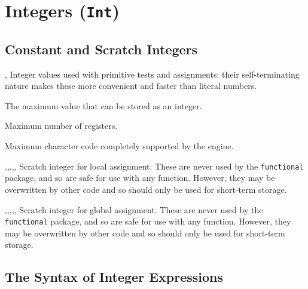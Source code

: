 \documentclass[oneside]{book}
\begin{document}
\chapter{Integers (\texttt{Int})}

\section{Constant and Scratch Integers}

\begin{variable}{\cZeroInt,\cOneInt}
Integer values used with primitive tests and assignments: their
self-terminating nature makes these more convenient and faster than
literal numbers.
\end{variable}

\begin{variable}{\cMaxInt}
The maximum value that can be stored as an integer.
\end{variable}

\begin{variable}{\cMaxRegisterInt}
Maximum number of registers.
\end{variable}

\begin{variable}{\cMaxCharInt}
Maximum character code completely supported by the engine.
\end{variable}

\begin{variable}{\lTmpaInt,\lTmpbInt,\lTmpcInt,\lTmpiInt,\lTmpjInt,\lTmpkInt}
Scratch integer for local assignment. These are never used by
the \verb!functional! package, and so are safe for use with any
function. However, they may be overwritten by other
code and so should only be used for short-term storage.
\end{variable}

\begin{variable}{\gTmpaInt,\gTmpbInt,\gTmpcInt,\gTmpiInt,\gTmpjInt,\gTmpkInt}
Scratch integer for global assignment. These are never used by
the \verb!functional! package, and so are safe for use with any
function. However, they may be overwritten by other
code and so should only be used for short-term storage.
\end{variable}

\section{The Syntax of Integer Expressions}
\end{document}
